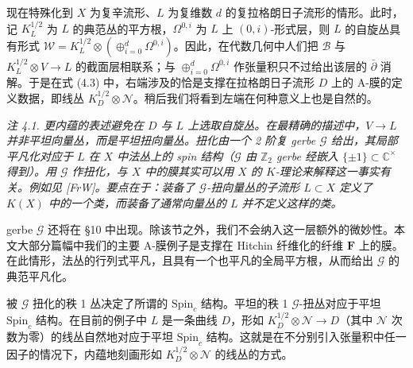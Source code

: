现在特殊化到 $X$ 为复辛流形、$L$ 为复维数 $d$ 的复拉格朗日子流形的情形。此时，记 $K_L^{1/2}$ 为 $L$ 的典范丛的平方根，$\Omega^{0,i}$ 为 $L$ 上 $(0,i)$-形式层，则 $L$ 的自旋丛具有形式 $\mathcal{W}=K_L^{1/2}\otimes(\oplus_{i=0}^{d}\Omega^{0,i})$。因此，在代数几何中人们把 $\mathcal{B}$ 与 $K_L^{1/2}\otimes V\to L$ 的截面层相联系；与 $\oplus_{i=0}^{d}\Omega^{0,i}$ 作张量积只不过给出该层的 $\bar\partial$ 消解。于是在式 (4.3) 中，右端涉及的恰是支撑在拉格朗日子流形 $D$ 上的 A-膜的定义数据，即线丛 $K_D^{1/2}\otimes\mathcal{N}$。稍后我们将看到左端在何种意义上也是自然的。


\par\medskip\noindent\textit{注 4.1. 更内蕴的表述避免在 $D$ 与 $L$ 上选取自旋丛。在最精确的描述中，$V\to L$ 并非平坦向量丛，而是平坦扭向量丛。扭化由一个 2 阶复 gerbe $\mathcal{G}$ 给出，其局部平凡化对应于 $L$ 在 $X$ 中法丛上的 spin 结构（$\mathcal{G}$ 由 $\mathbb{Z}_2$ gerbe 经嵌入 $\{\pm1\}\subset\mathbb{C}^\times$ 得到）。用 $\mathcal{G}$ 作扭化，与 $X$ 中的膜其实可以用 $X$ 的 $K$-理论来解释这一事实有关。例如见 [FrW]。要点在于：装备了 $\mathcal{G}$-扭向量丛的子流形 $L\subset X$ 定义了 $K(X)$ 中的一个类，而装备了通常向量丛的 $L$ 并不定义这样的类。}

gerbe $\mathcal{G}$ 还将在 §10 中出现。除该节之外，我们不会纳入这一层额外的微妙性。本文大部分篇幅中我们的主要 A-膜例子是支撑在 Hitchin 纤维化的纤维 $\boldsymbol{F}$ 上的膜。在此情形，法丛的行列式平凡，且具有一个也平凡的全局平方根，从而给出 $\mathcal{G}$ 的典范平凡化。


被 $\mathcal{G}$ 扭化的秩 1 丛决定了所谓的 $\mathrm{Spin}_c$ 结构。平坦的秩 1 $\mathcal{G}$-扭丛对应于平坦 $\mathrm{Spin}_c$ 结构。在目前的例子中 $L$ 是一条曲线 $D$，形如 $K_D^{1/2}\otimes\mathcal{N}\to D$（其中 $\mathcal{N}$ 次数为零）的线丛自然地对应于平坦 $\mathrm{Spin}_c$ 结构。这就是在不分别引入张量积中任一因子的情况下，内蕴地刻画形如 $K_D^{1/2}\otimes\mathcal{N}$ 的线丛的方式。

